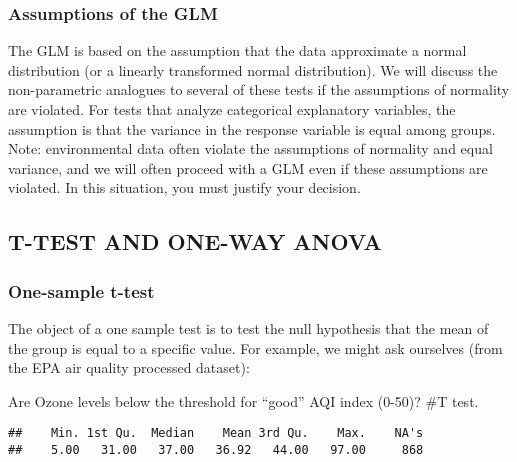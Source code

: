 \documentclass[]{article}
\newenvironment{Shaded}{\begin{snugshade}}{\end{snugshade}}
\newcommand{\KeywordTok}[1]{\textcolor[rgb]{0.13,0.29,0.53}{\textbf{#1}}}
\newcommand{\CommentTok}[1]{\textcolor[rgb]{0.56,0.35,0.01}{\textit{#1}}}
\newcommand{\OperatorTok}[1]{\textcolor[rgb]{0.81,0.36,0.00}{\textbf{#1}}}
\newcommand{\NormalTok}[1]{#1}
\begin{document}
\subsubsection{Assumptions of the GLM}\label{assumptions-of-the-glm}

The GLM is based on the assumption that the data approximate a normal
distribution (or a linearly transformed normal distribution). We will
discuss the non-parametric analogues to several of these tests if the
assumptions of normality are violated. For tests that analyze
categorical explanatory variables, the assumption is that the variance
in the response variable is equal among groups. Note: environmental data
often violate the assumptions of normality and equal variance, and we
will often proceed with a GLM even if these assumptions are violated. In
this situation, you must justify your decision.

\subsection{T-TEST AND ONE-WAY ANOVA}\label{t-test-and-one-way-anova}

\subsubsection{One-sample t-test}\label{one-sample-t-test}

The object of a one sample test is to test the null hypothesis that the
mean of the group is equal to a specific value. For example, we might
ask ourselves (from the EPA air quality processed dataset):

Are Ozone levels below the threshold for ``good'' AQI index (0-50)? \#T
test.

\begin{Shaded}
\end{Shaded}

\begin{verbatim}
##    Min. 1st Qu.  Median    Mean 3rd Qu.    Max.    NA's 
##    5.00   31.00   37.00   36.92   44.00   97.00     868
\end{verbatim}

\begin{Shaded}
\end{Shaded}
\end{document}
